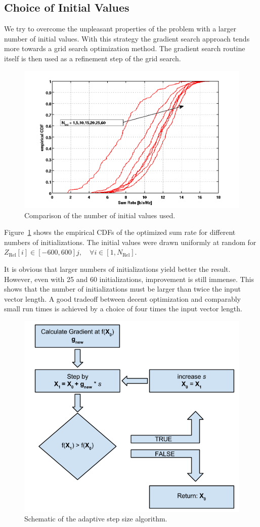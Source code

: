 \subsection{Choice of Initial Values}
\label{sec:grads_ini}
We try to overcome the unpleasant properties of the problem with a larger number of initial values.
With this strategy the gradient search approach tends more towards a grid search optimization method.
The gradient search routine itself is then used as a refinement step of the grid search.
\begin{figure}[h]
\centering
  \includegraphics[width=0.9\linewidth]{images/Inicomparison_edited.png}
\caption{Comparison of the number of initial values used.}
\label{fig:ini_comp}
\end{figure}


Figure~\ref{fig:ini_comp} shows the empirical CDFs of the optimized sum rate for different numbers of initializations.
The initial values were drawn uniformly at random for $Z_{\text{Rel}}[i]\in[-600,600] j , \quad\forall i\in[1,N_{\text{Rel}}]$.

It is obvious that larger numbers of initializations yield better the result.
However, even with 25 and 60 initializations, improvement is still immense.
This shows that the number of initializations must be larger than twice the input vector length.
A good tradeoff between decent optimization and comparably small run times is achieved by a choice of four times the input vector length.
\begin{figure}[h]
\centering
  \includegraphics[width=0.5\linewidth]{images/stepsize_scheme.png}
\caption{Schematic of the adaptive step size algorithm.}
\label{fig:stepsize}
\end{figure}

